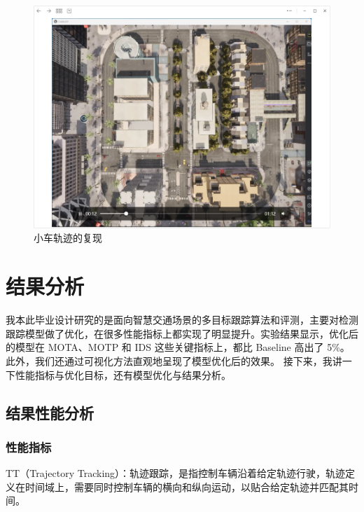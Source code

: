 \begin{figure}[htbp] %
	\centering
	\includegraphics[width=1\textwidth]{p21} %
	\caption{小车轨迹的复现} %
	\label{fig:p21} %
\end{figure}






\section{结果分析}

我本此毕业设计研究的是面向智慧交通场景的多目标跟踪算法和评测，主要对检测跟踪模型做了优化，在很多性能指标上都实现了明显提升。实验结果显示，优化后的模型在 MOTA、MOTP 和 IDS 这些关键指标上，都比 Baseline 高出了 5\%。此外，我们还通过可视化方法直观地呈现了模型优化后的效果。
接下来，我讲一下性能指标与优化目标，还有模型优化与结果分析。








\subsection{结果性能分析}
\subsubsection{性能指标}
TT（Trajectory Tracking）：轨迹跟踪，是指控制车辆沿着给定轨迹行驶，轨迹定义在时间域上，需要同时控制车辆的横向和纵向运动，以贴合给定轨迹并匹配其时间。

